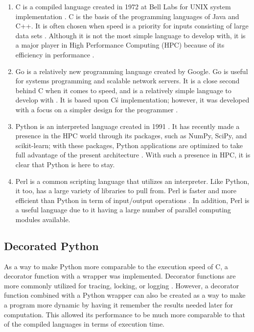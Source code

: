 \documentclass{sig-alternate}
\begin{document}
\begin{enumerate}
\item {\em}C is a compiled language created in 1972 at Bell Labs for UNIX system implementation \cite{languages}. C is the basis of the programming languages of Java and C++. It is often chosen when speed is a priority for inputs consisting of large data sets \cite{nicepaper1}. Although it is not the most simple language to develop with, it is a major player in High Performance Computing (HPC) because of its efficiency in performance \cite{HPC}.
\item {\em}Go is a relatively new programming language created by Google. Go is useful for systems programming and scalable network servers. It is a close second behind C when it comes to speed, and is a relatively simple language to develop with \cite{HPC}. It is based upon C\'s implementation; however, it was developed with a focus on a simpler design for the programmer \cite{HPC}. 
\item {\em}Python is an interpreted language created in 1991 \cite{Python}. It has recently made a presence in the HPC world through its packages, such as NumPy, SciPy, and scikit-learn; with these packages, Python applications are optimized to take full 
advantage of the present architecture \cite{Python}. With such a presence in HPC, it is clear that Python is here to stay.
\item  {\em}Perl is a common scripting language that utilizes an interpreter. Like Python, it too, has a large variety of libraries to pull from. Perl is faster and more efficient than Python in term of input/output operations \cite{Bioinformatics}. In addition, Perl is a useful language due to it having a large number of parallel computing modules available.
\end{enumerate}


\subsection{Decorated Python}

As a way to make Python more comparable to the execution speed of C, a decorator function with a wrapper was implemented. Decorator functions are more commonly utilized for tracing, locking, or logging \cite{nicepaper2}. However, a decorator function combined with a Python wrapper can also be created as a way to make a program more dynamic by having it remember the results needed later for computation. This allowed its performance to be much more comparable to that of the compiled languages in terms of execution time.
\end{document}
